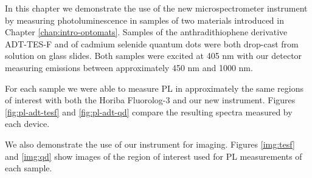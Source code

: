 
In this chapter we demonstrate the use of the new microspectrometer instrument by measuring photoluminescence in samples of two materials introduced in Chapter \ref{chap:intro-optomats}. Samples of the anthradithiophene derivative ADT-TES-F and of cadmium selenide quantum dots were both drop-cast from solution on glass slides. Both samples were excited at 405 nm with our detector measuring emissions between approximately 450 nm and 1000 nm.

For each sample we were able to measure PL in approximately the same regions of interest with both the Horiba Fluorolog-3 and our new instrument. Figures \ref{fig:pl-adt-tesf} and \ref{fig:pl-adt-qd} compare the resulting spectra measured by each device. 

We also demonstrate the use of our instrument for imaging. Figures \ref{img:tesf} and \ref{img:qd} show images of the region of interest used for PL measurements of each sample. 

